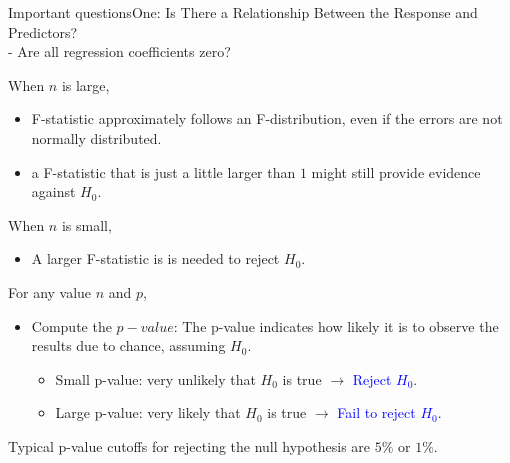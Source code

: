 \begin{frame}{Important questions}{One: Is There a Relationship Between the Response and Predictors? \\ - Are all regression coefficients zero? }

When $n$ is large, \pause

\begin{itemize}
    \item F-statistic approximately follows
an F-distribution, even if the errors are not normally distributed. \pause

    \item a F-statistic that is just a little larger than $1$ might still provide evidence against $H_0$.
\end{itemize} \pause

When $n$ is small, \pause

\begin{itemize}
    \item A larger F-statistic is is needed to reject $H_0$. \pause
\end{itemize}

For any value $n$ and $p$, \pause
\begin{itemize}

    \item Compute the $p-value$: The p-value indicates how likely it is to observe the results due to chance, assuming $H_0$. \pause
        \begin{itemize}
            \item Small p-value: very unlikely that $H_0$ is true $\rightarrow$ \textcolor{blue}{Reject $H_0$}. \pause
            \item Large p-value: very likely that $H_0$ is true $\rightarrow$ \textcolor{blue}{Fail to reject $H_0$.} \pause 
        \end{itemize}
    
\end{itemize}

Typical p-value cutoﬀs for rejecting the null hypothesis are $5\%$ or $1\%$.
    
\end{frame}


